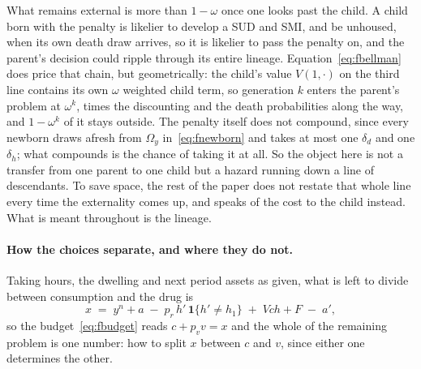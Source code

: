 \documentclass[10pt]{article}
\begin{document}
What remains external is more than $1-\omega$ once one looks past the
child. A child born with the penalty is likelier to develop a SUD and SMI, and be
unhoused, when its own death draw arrives, so it is likelier to pass the penalty on,
and the parent's decision could ripple through its entire lineage.
Equation~\eqref{eq:fbellman} does price that chain, but geometrically: the child's
value $V(1,\cdot)$ on the third line contains its own $\omega$ weighted child term, so
generation $k$ enters the parent's problem at $\omega^k$, times the discounting and
the death probabilities along the way, and $1-\omega^k$ of it stays outside. The
penalty itself does not compound, since every newborn draws afresh from $\Omega_y$
in~\eqref{eq:fnewborn} and takes at most one $\delta_d$ and one $\delta_h$; what
compounds is the chance of taking it at all. So the object here is not a transfer from
one parent to one child but a hazard running down a line of descendants.
To save space, the rest of the paper does not restate that whole line
every time the externality comes up, and speaks of the cost to the child instead. What
is meant throughout is the lineage.

\paragraph{How the choices separate, and where they do not.}
Taking hours, the dwelling and next
period assets as given, what is left to divide
between consumption and the drug is
\begin{equation}\label{eq:fresource}
x\;=\;y^{n}+a\;-\;p_r\,h'\,\mathbf{1}\{h'\neq h_1\}\;+\;V\!ch+F\;-\;a' ,
\end{equation}
so the budget~\eqref{eq:fbudget} reads $c+p_v v=x$ and the whole of the
remaining problem is one number: how to split $x$ between $c$ and $v$, since
either one determines the other.
\end{document}

